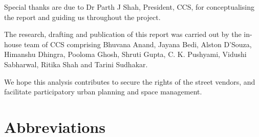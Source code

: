 \documentclass[a4paper, 12pt, twoside]{article}
\begin{document}
Special thanks are due to Dr Parth J Shah, President, CCS, for conceptualising the report and guiding us throughout the project. 

The research, drafting and publication of this report was carried out by the in-house team of CCS comprising Bhuvana Anand, Jayana Bedi, Alston D'Souza, Himanshu Dhingra, Pooloma Ghosh, Shruti Gupta, C. K. Pushyami, Vidushi Sabharwal, Ritika Shah and Tarini Sudhakar. 

We hope this analysis contributes to secure the rights of the street vendors, and facilitate participatory urban planning and space management.
\newpage
\tableofcontents

\newpage
{}

\section*{Abbreviations}
\end{document}
